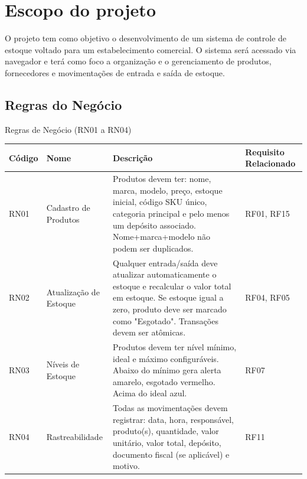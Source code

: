 \documentclass[
	12pt,				%
	openany,			%
	twoside,			%
	a4paper,			%
	english,			%
	brazil				%
	]{abntex2}
\begin{document}
\section{Escopo do projeto}

O projeto tem como objetivo o desenvolvimento de um sistema de controle de estoque voltado para um estabelecimento comercial. O sistema será acessado via navegador e terá como foco a organização e o gerenciamento de produtos, fornecedores e movimentações de entrada e saída de estoque.




\subsection{Regras do Negócio}



\begin{quadro}[htb]
\caption{\label{quadro_rn1}Regras de Negócio (RN01 a RN04)}
\centering
\begin{tabular}{|p{1.6cm}|p{4.0cm}|p{7.5cm}|p{2.0cm}|}
    \hline
    \textbf{Código} & \textbf{Nome} & \textbf{Descrição} & \textbf{Requisito Relacionado} \\ \hline

    RN01 & Cadastro de Produtos & Produtos devem ter: nome, marca, modelo, preço, estoque inicial, código SKU único, categoria principal e pelo menos um depósito associado. Nome+marca+modelo não podem ser duplicados. & RF01, RF15 \\ \hline

    RN02 & Atualização de Estoque & Qualquer entrada/saída deve atualizar automaticamente o estoque e recalcular o valor total em estoque. Se estoque igual a zero, produto deve ser marcado como "Esgotado". Transações devem ser atômicas. & RF04, RF05 \\ \hline

    RN03 & Níveis de Estoque & Produtos devem ter nível mínimo, ideal e máximo configuráveis. Abaixo do mínimo gera alerta amarelo, esgotado vermelho. Acima do ideal azul. & RF07 \\ \hline

    RN04 & Rastreabilidade & Todas as movimentações devem registrar: data, hora, responsável, produto(s), quantidade, valor unitário, valor total, depósito, documento fiscal (se aplicável) e motivo. & RF11 \\ \hline

    

\end{tabular}
\end{quadro}
\end{document}
